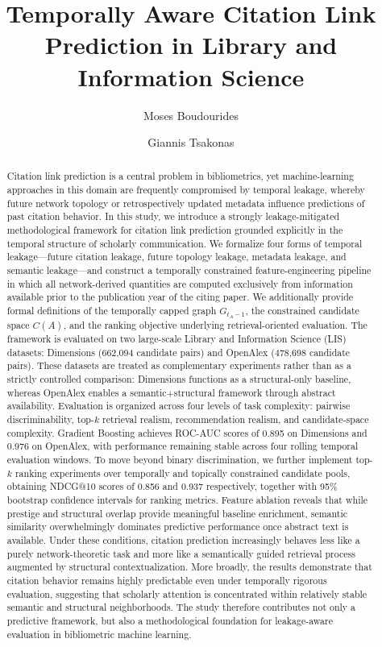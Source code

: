 \documentclass[11pt,a4paper]{article}
\title{Temporally Aware Citation Link Prediction in Library and Information Science}
\author[1]{Moses Boudourides}
\author[2]{Giannis Tsakonas}
\affil[1]{School of Professional Studies, Northwestern University, Evanston, IL, USA%
\authorcr\texttt{Moses.Boudourides@northwestern.edu}}
\affil[2]{Library \& Information Center, University of Patras, Greece%
\authorcr\texttt{gtsak@upatras.gr}}
\date{}
\begin{document}
\maketitle

\begin{abstract}
Citation link prediction is a central problem in bibliometrics, yet machine-learning approaches in this domain are frequently compromised by temporal leakage, whereby future network topology or retrospectively updated metadata influence predictions of past citation behavior. In this study, we introduce a strongly leakage-mitigated methodological framework for citation link prediction grounded explicitly in the temporal structure of scholarly communication. We formalize four forms of temporal leakage---future citation leakage, future topology leakage, metadata leakage, and semantic leakage---and construct a temporally constrained feature-engineering pipeline in which all network-derived quantities are computed exclusively from information available prior to the publication year of the citing paper. We additionally provide formal definitions of the temporally capped graph \(G_{t_A-1}\), the constrained candidate space \(C(A)\), and the ranking objective underlying retrieval-oriented evaluation. The framework is evaluated on two large-scale Library and Information Science (LIS) datasets: Dimensions (662,094 candidate pairs) and OpenAlex (478,698 candidate pairs). These datasets are treated as complementary experiments rather than as a strictly controlled comparison: Dimensions functions as a structural-only baseline, whereas OpenAlex enables a semantic+structural framework through abstract availability. Evaluation is organized across four levels of task complexity: pairwise discriminability, top-\(k\) retrieval realism, recommendation realism, and candidate-space complexity. Gradient Boosting achieves ROC-AUC scores of 0.895 on Dimensions and 0.976 on OpenAlex, with performance remaining stable across four rolling temporal evaluation windows. To move beyond binary discrimination, we further implement top-\(k\) ranking experiments over temporally and topically constrained candidate pools, obtaining NDCG@10 scores of 0.856 and 0.937 respectively, together with 95\% bootstrap confidence intervals for ranking metrics. Feature ablation reveals that while prestige and structural overlap provide meaningful baseline enrichment, semantic similarity overwhelmingly dominates predictive performance once abstract text is available. Under these conditions, citation prediction increasingly behaves less like a purely network-theoretic task and more like a semantically guided retrieval process augmented by structural contextualization. More broadly, the results demonstrate that citation behavior remains highly predictable even under temporally rigorous evaluation, suggesting that scholarly attention is concentrated within relatively stable semantic and structural neighborhoods. The study therefore contributes not only a predictive framework, but also a methodological foundation for leakage-aware evaluation in bibliometric machine learning.
\end{abstract}
\end{document}
